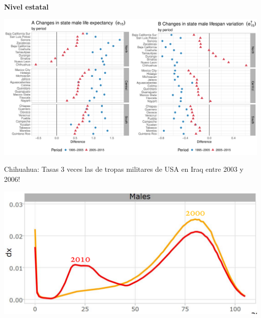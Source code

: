 \documentclass[xcolor={dvipsnames}]{beamer}
\begin{document}
\begin{frame}
\begin{center}
\Large{\textbf{Nivel estatal}}
\end{center}

\hspace*{-1cm}   
\includegraphics[scale=.38]{Figures/Figure_3}

\end{frame}



\begin{frame}

\Large{
Chihuahua: Tasas 3 veces las de tropas militares de USA en Iraq entre 2003 y 2006!
				\begin{center}
		\includegraphics[scale=.45]{Figures/Distr_chihuahua}
				\end{center}				

}
\end{frame}
\end{document}
